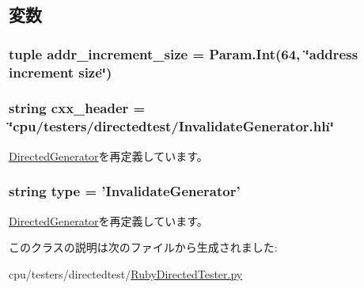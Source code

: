 \subsection{変数}
\hypertarget{classRubyDirectedTester_1_1InvalidateGenerator_a55a1d04584c3ff8e876c814204071ea5}{
\subsubsection[{addr\_\-increment\_\-size}]{\setlength{\rightskip}{0pt plus 5cm}tuple {\bf addr\_\-increment\_\-size} = Param.Int(64, \char`\"{}address increment size\char`\"{})}}
\label{classRubyDirectedTester_1_1InvalidateGenerator_a55a1d04584c3ff8e876c814204071ea5}
\hypertarget{classRubyDirectedTester_1_1InvalidateGenerator_a17da7064bc5c518791f0c891eff05fda}{
\subsubsection[{cxx\_\-header}]{\setlength{\rightskip}{0pt plus 5cm}string {\bf cxx\_\-header} = \char`\"{}cpu/testers/directedtest/InvalidateGenerator.hh\char`\"{}}}
\label{classRubyDirectedTester_1_1InvalidateGenerator_a17da7064bc5c518791f0c891eff05fda}


\hyperlink{classRubyDirectedTester_1_1DirectedGenerator_a17da7064bc5c518791f0c891eff05fda}{DirectedGenerator}を再定義しています。\hypertarget{classRubyDirectedTester_1_1InvalidateGenerator_acce15679d830831b0bbe8ebc2a60b2ca}{
\subsubsection[{type}]{\setlength{\rightskip}{0pt plus 5cm}string {\bf type} = '{\bf InvalidateGenerator}'}}
\label{classRubyDirectedTester_1_1InvalidateGenerator_acce15679d830831b0bbe8ebc2a60b2ca}


\hyperlink{classRubyDirectedTester_1_1DirectedGenerator_acce15679d830831b0bbe8ebc2a60b2ca}{DirectedGenerator}を再定義しています。

このクラスの説明は次のファイルから生成されました:\begin{DoxyCompactItemize}
\item 
cpu/testers/directedtest/\hyperlink{RubyDirectedTester_8py}{RubyDirectedTester.py}\end{DoxyCompactItemize}
